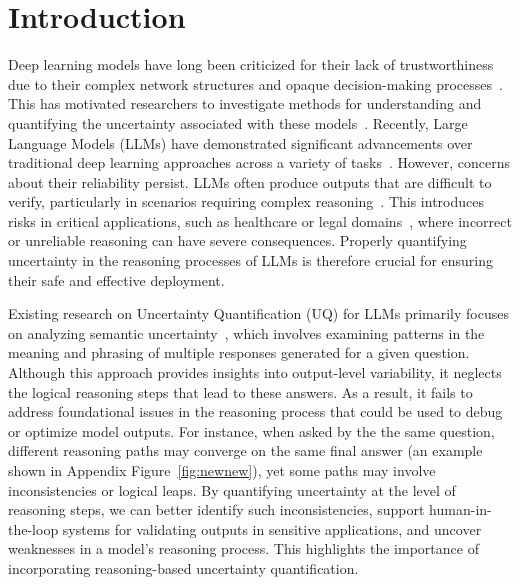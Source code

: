 
\section{Introduction}


Deep learning models have long been criticized for their lack of trustworthiness due to their complex network structures and opaque decision-making processes~\cite{li2022deeplearninginterpretable,doshi2017interpretable,samek2021explainingdl}. This has motivated researchers to investigate methods for understanding and quantifying the uncertainty associated with these models~\cite{abdar2021dluncertaintyreview,loquercio2020generaluncertainty,maddox2019simpleuncertainty}. Recently, Large Language Models (LLMs) have demonstrated significant advancements over traditional deep learning approaches across a variety of tasks~\cite{zhao2023surveyllm,naveed2023comprehensivellm}. However, concerns about their reliability persist. LLMs often produce outputs that are difficult to verify, particularly in scenarios requiring complex reasoning~\cite{shi2024llmreasoning}. This introduces risks in critical applications, such as healthcare or legal domains~\cite{cascella2023llm-hearcare,jayakumar2023llm-legal}, where incorrect or unreliable reasoning can have severe consequences. Properly quantifying uncertainty in the reasoning processes of LLMs is therefore crucial for ensuring their safe and effective deployment.

Existing research on Uncertainty Quantification (UQ) for LLMs primarily focuses on analyzing semantic uncertainty~\cite{kuhn2023semantic,lin2023generating, qiu2024semanticuq, da2024llm}, which involves examining patterns in the meaning and phrasing of multiple responses generated for a given question. Although this approach provides insights into output-level variability, it neglects the logical reasoning steps that lead to these answers. As a result, it fails to address foundational issues in the reasoning process that could be used to debug or optimize model outputs. For instance, when asked by the the same question, different reasoning paths may converge on the same final answer (an example shown in Appendix Figure~\ref{fig:newnew}), yet some paths may involve inconsistencies or logical leaps. By quantifying uncertainty at the level of reasoning steps, we can better identify such inconsistencies, support human-in-the-loop systems for validating outputs in sensitive applications, and uncover weaknesses in a model's reasoning process. This highlights the importance of incorporating reasoning-based uncertainty quantification.

